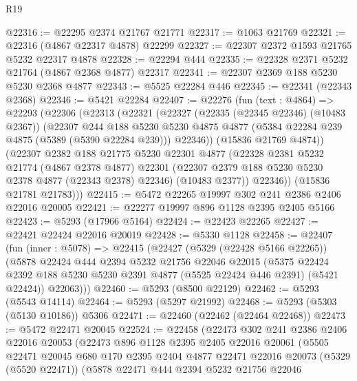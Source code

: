 \begin{lexlean}{R19}
\begin{coremodule}
@22316 := @22295 @2374 @21767 @21771
@22317 := @1063 @21769
@22321 := @22316 (@4867 @22317 @4878) @22299
@22327 := @22307 @2372 @1593 @21765 @5232 @22317 @4878
@22328 := @22294 @444
@22335 := @22328 @2371 @5232 @21764 (@4867 @2368 @4877) @22317
@22341 := @22307 @2369 @188 @5230 @5230 @2368 @4877
@22343 := @5525 @22284 @446
@22345 := @22341 (@22343 @2368)
@22346 := @5421 @22284
@22407 := @22276
    (fun (text : @4864) =>
    @22293
      (@22306
        (@22313
          (@22321
            (@22327
              (@22335 (@22345 @22346) (@10483 @2367))
              (@22307
                @244
                @188
                @5230
                @5230
                @4875
                @4877
                (@5384 @22284 @239 @4875 (@5389 (@5390 @22284 @239)))
                @22346))
            (@15836 @21769 @4874))
          (@22307
            @2382
            @188
            @21775
            @5230
            @22301
            @4877
            (@22328
              @2381
              @5232
              @21774
              (@4867 @2378 @4877)
              @22301
              (@22307 @2379 @188 @5230 @5230 @2378 @4877 (@22343 @2378) @22346)
              (@10483 @2377))
            @22346))
        (@15836 @21781 @21783)))
@22415 := @5472 @22265 @19997 @302 @241 @2386 @2406 @22016 @20005
@22421 := @22277 @19997 @896 @1128 @2395 @2405 @5166
@22423 := @5293 (@17966 @5164)
@22424 := @22423 @22265
@22427 := @22421 @22424 @22016 @20019
@22428 := @5330 @1128
@22458 := @22407
    (fun (inner : @5078) =>
    @22415
      (@22427
        (@5329 (@22428 @5166 @22265))
        (@5878
          @22424
          @444
          @2394
          @5232
          @21756
          @22046
          @22015
          (@5375 @22424 @2392 @188 @5230 @5230 @2391 @4877 (@5525 @22424 @446 @2391) (@5421 @22424))
          @22063)))
@22460 := @5293 (@8500 @22129)
@22462 := @5293 (@5543 @14114)
@22464 := @5293 (@5297 @21992)
@22468 := @5293 (@5303 (@5130 @10186)) @5306
@22471 := @22460 (@22462 (@22464 @22468))
@22473 := @5472 @22471 @20045
@22524 := @22458
    (@22473
      @302
      @241
      @2386
      @2406
      @22016
      @20053
      (@22473
        @896
        @1128
        @2395
        @2405
        @22016
        @20061
        (@5505
          @22471
          @20045
          @680
          @170
          @2395
          @2404
          @4877
          @22471
          @22016
          @20073
          (@5329 (@5520 @22471))
          (@5878
            @22471
            @444
            @2394
            @5232
            @21756
            @22046

\end{coremodule}
\end{lexlean}
